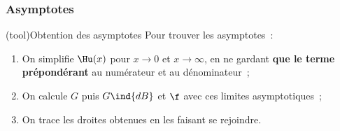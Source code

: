 \documentclass[../../main/main.tex]{subfiles}
\begin{document}
\subsubsection{Asymptotes}
\begin{tcb*}(tool){Obtention des asymptotes}
	Pour trouver les asymptotes~:
	\begin{enumerate}
		\item On simplifie $\Hu(x)$ pour $x\to 0$ et $x\to \infty$, en ne gardant
		      \textbf{que le terme prépondérant} au numérateur et au dénominateur~;
		\item On calcule $G$ puis $G\ind{dB}$ et $\f$ avec ces limites asymptotiques~;
		\item On trace les droites obtenues en les faisant se rejoindre.
	\end{enumerate}
\end{tcb*}
\end{document}
